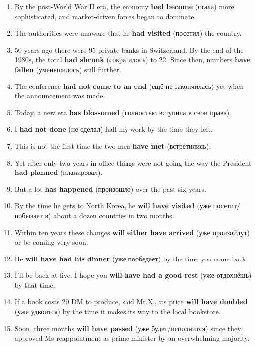 \documentclass[main.tex]{subfiles}
\begin{document}

\begin{enumerate}[nosep,leftmargin=*]
	\itemsep\eitsp
	\item By the post-World War II era, the economy \textbf{had become} (стала) more sophisticated, and market-driven forces began to dominate.
	\item The authorities were unaware that he \textbf{had visited} (посетил) the country.
	\item 50 years ago there were 95 private banks in Switzerland. By the end of the 1980s, the total \textbf{had shrunk} (сократилось) to 22. Since then, numbers \textbf{have fallen} (уменьшилось) still further.
	\item The conference \textbf{had not come to an end} (ещё не закончилась) yet when the announcement was made.
	\item Today, a new era \textbf{has blossomed} (полностью вступила в свои права).
	\item I \textbf{had not done} (не сделал) half my work by the time they left.
	\item This is not the first time the two men \textbf{have met} (встретились).
	\item Yet after only two years in office things were not going the way the President \textbf{had planned} (планировал).
	\item But a lot \textbf{has happened} (произошло) over the past six years.
	\item By the time he gets to North Korea, he \textbf{will have visited} (уже посетит/побывает в) about a dozen countries in two months.
	\item Within ten years these changes \textbf{will either have arrived} (уже произойдут) or be coming very soon.
	\item He \textbf{will have had his dinner} (уже пообедает) by the time you come back.
	\item I'll be back at five. I hope you \textbf{will have had a good rest} (уже отдохнёшь) by that time.
	\item If a book costs 20 DM to produce, said Mr.X., its price \textbf{will have doubled} (уже удвоится) by the time it makes its way to the local bookstore.
	\item Soon, three months \textbf{will have passed} (уже будет/исполнится) since they approved Ms reappointment as prime minister by an overwhelming majority.
\end{enumerate}
\ 
\end{document}
